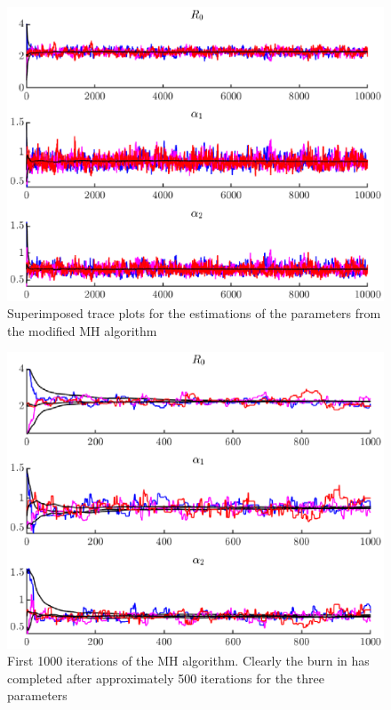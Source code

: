 \documentclass{X:/Documents/Coding/Latex/myassignment}
\begin{document}
\begin{figure}[tbh]
	\centering
	\includegraphics[width=\linewidth]{MHplot0.eps}
	\caption{Superimposed trace plots for the estimations of the parameters from the modified MH algorithm}
	\label{fig:fullrun}
\end{figure}

\begin{figure}[tbh]
	\centering
	\includegraphics[width=\linewidth]{MHplot1.eps}
	\caption{First 1000 iterations of the MH algorithm. Clearly the burn in has completed after approximately 500 iterations for the three parameters }
	\label{fig:burnin}
\end{figure}
\end{document}
